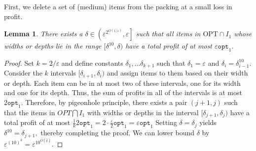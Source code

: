 \documentclass[10pt,a4paper]{amsart}
\newcommand{\ari}[1]{#1}
\newcommand{\eps}{\varepsilon}
\renewcommand{\epsilon}{\varepsilon} %
\newtheorem{lemma}[theorem]{Lemma}
\theoremstyle{definition}
\newcommand{\opt}{\mathtt{opt}}
\begin{document}

First, we delete a set of (medium) items from the packing at a small loss in profit.

\begin{lemma}
\label{lem:deletemediumitems}
    \ari{There exists a $\delta \in \left(\epsilon^{2^{O(1/\epsilon)}}, \epsilon\right]$ such that all items in $\text{OPT}\cap I_1$ whose widths or depths lie in the range $[\delta^{10},\delta)$ have a total profit of at most $\epsilon\opt_1$.}
\end{lemma}
\begin{proof}
    Set $k=2/\varepsilon$ and define constants $\delta_1,\ldots \delta_{k+1}$ such that $\delta_1=\varepsilon$ and $\delta_i=\delta_{i-1}^{10}.$ Consider the $k$ intervals $[\delta_{i+1}, \delta_i)$ and assign items to them based on their width or depth.  Each item can be in at most two of these intervals, one for its width and one for its depth. Thus, the sum of profits in all of the intervals is at most $2\opt_1.$  Therefore, by pigeonhole principle, there exists a pair $(j+1, j)$ such that the items in $OPT\bigcap I_1$ with widths or depths in the interval $[\delta_{j+1}, \delta_j)$ have a total profit of at most $\frac{1}{k}2\opt_1=2\cdot \frac{\varepsilon}{2}\opt_1=\eps \opt_1$ Setting $\delta=\delta_{j}$ yields $\delta^{10}=\delta_{j+1},$ thereby completing the proof. We can lower bound $\delta$ by $\eps^{(10)^{k}}=\eps^{10^{O(\frac{1}{\eps})}}.$
\end{proof}
\end{document}
